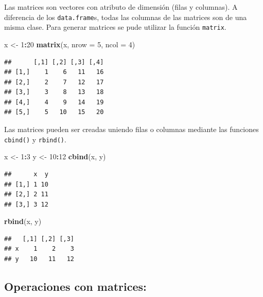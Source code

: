 \documentclass[]{book}
\newenvironment{Shaded}{\begin{snugshade}}{\end{snugshade}}
\newcommand{\KeywordTok}[1]{\textcolor[rgb]{0.13,0.29,0.53}{\textbf{#1}}}
\newcommand{\DataTypeTok}[1]{\textcolor[rgb]{0.13,0.29,0.53}{#1}}
\newcommand{\DecValTok}[1]{\textcolor[rgb]{0.00,0.00,0.81}{#1}}
\newcommand{\StringTok}[1]{\textcolor[rgb]{0.31,0.60,0.02}{#1}}
\newcommand{\OperatorTok}[1]{\textcolor[rgb]{0.81,0.36,0.00}{\textbf{#1}}}
\newcommand{\NormalTok}[1]{#1}
\begin{document}
Las matrices son vectores con atributo de dimensión (filas y columnas).
A diferencia de los \texttt{data.frame}s, todas las columnas de las
matrices son de una misma clase. Para generar matrices se pude utilizar
la función \texttt{matrix}.

\begin{Shaded}
\begin{Highlighting}[]
\NormalTok{x <-}\StringTok{ }\DecValTok{1}\OperatorTok{:}\DecValTok{20}
\KeywordTok{matrix}\NormalTok{(x, }\DataTypeTok{nrow =} \DecValTok{5}\NormalTok{, }\DataTypeTok{ncol =} \DecValTok{4}\NormalTok{)}
\end{Highlighting}
\end{Shaded}

\begin{verbatim}
##      [,1] [,2] [,3] [,4]
## [1,]    1    6   11   16
## [2,]    2    7   12   17
## [3,]    3    8   13   18
## [4,]    4    9   14   19
## [5,]    5   10   15   20
\end{verbatim}

Las matrices pueden ser creadas uniendo filas o columnas mediante las
funciones \texttt{cbind()} y \texttt{rbind()}.

\begin{Shaded}
\begin{Highlighting}[]
\NormalTok{x <-}\StringTok{ }\DecValTok{1}\OperatorTok{:}\DecValTok{3}
\NormalTok{y <-}\StringTok{ }\DecValTok{10}\OperatorTok{:}\DecValTok{12}
\KeywordTok{cbind}\NormalTok{(x, y)}
\end{Highlighting}
\end{Shaded}

\begin{verbatim}
##      x  y
## [1,] 1 10
## [2,] 2 11
## [3,] 3 12
\end{verbatim}

\begin{Shaded}
\begin{Highlighting}[]
\KeywordTok{rbind}\NormalTok{(x, y) }
\end{Highlighting}
\end{Shaded}

\begin{verbatim}
##   [,1] [,2] [,3]
## x    1    2    3
## y   10   11   12
\end{verbatim}

\subsection{Operaciones con matrices:}\label{operaciones-con-matrices}
\end{document}
